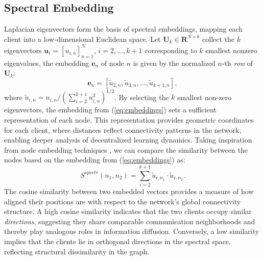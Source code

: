 \documentclass[journal]{IEEEtran}
\begin{document}
\subsection{Spectral Embedding} 
Laplacian eigenvectors form the basis of spectral embeddings, mapping each client into a low-dimensional Euclidean space. Let $\mathbf{U}_k \in \mathbf{R}^{N \times k}$ collect the $k$ eigenvectors $\mathbf{u}_i=[u_{i,n}]_{n=1}^{N}$, $i=2, ...,k+1$ corresponding to $k$ smallest nonzero eigenvalues, the embedding $\mathbf{e}_n$ of node $n$ is given by the normalized $n$-th \textit{row} of $\mathbf{U}_k$:
\begin{equation} 
    \mathbf{e}_n = [\tilde{u}_{2,n}, \tilde{u}_{3,n}, \dots, \tilde{u}_{k+1,n}], 
\label{eq:embeddings}
\end{equation} 
where $\tilde{u}_{i,n} = u_{i,n}/(\sum_{i=2}^{k+1} u_{i,n}^2 )^{1/2}$. 
By selecting the $k$ smallest non-zero eigenvectors, the embedding from (\ref{eq:embeddings}) sets a sufficient representation of each node. This representation provides geometric coordinates for each client, where distances reflect connectivity patterns in the network, enabling deeper analysis of decentralized learning dynamics. Taking inspiration from node embedding techniques \cite{deepwalk, node2vec}, we can compare the similarity between the nodes based on the embedding from (\ref{eq:embeddings}) as:
\begin{equation} \label{eq:cos_sim}
    S^{spectr}(n_1, n_2) = \sum_{i=2}^{k+1}  \tilde{u}_{i,n_1} \cdot \tilde{u}_{i,n_2}.
\end{equation}
The cosine similarity between two embedded vectors provides a measure of how aligned their positions are with respect to the network's global connectivity structure. A high cosine similarity indicates that the two clients occupy similar \textit{directions}, suggesting they share comparable communication neighborhoods and thereby play analogous roles in information diffusion. Conversely, a low similarity implies that the clients lie in orthogonal directions in the spectral space, reflecting structural dissimilarity in the graph.

\vspace{-0.3 cm}
\end{document}
